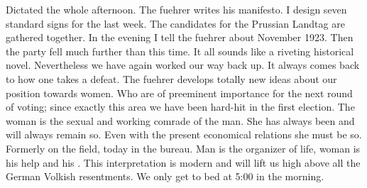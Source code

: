 Dictated the whole afternoon. The fuehrer writes his manifesto. I design seven standard signs for the last week. The candidates for the Prussian Landtag are gathered together. In the evening I tell the fuehrer about November 1923. Then the party fell much further than this time. It all sounds like a riveting historical novel. Nevertheless we have again worked our way back up. It always comes back to how one takes a defeat. The fuehrer develops totally new ideas about our position towards women. Who are of preeminent importance for the next round of voting; since exactly this area we have been hard-hit in the first election. The woman is the sexual and working comrade of the man. She has always been and will always remain so. Even with the present economical relations she must be so. Formerly on the field, today in the bureau. Man is the organizer of life, woman is his help and his . This interpretation is modern and will lift us high above all the German Volkish resentments. We only get to bed at 5:00 in the morning.